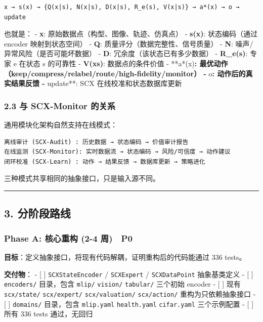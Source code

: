 \documentclass[
  12pt,
]{ctexart}
\begin{document}
\begin{verbatim}
x → s(x) → {Q(x|s), N(x|s), D(x|s), R_e(s), V(x|s)} → a*(x) → o → update
\end{verbatim}

也就是： - \textbf{x}: 原始数据点（构型、图像、轨迹、仿真点） -
\textbf{s(x)}: 状态编码（通过 encoder 映射到状态空间） - \textbf{Q}:
质量评分（数据完整性、信号质量） - \textbf{N}:
噪声/异常风险（是否可能坏数据） - \textbf{D}:
冗余度（该状态已有多少数据） - \textbf{R\_e(s)}: 专家 e 在状态 s
的可靠性 - \textbf{V(x\textbar s)}: 数据点的条件价值 - **a*(x)\textbf{:
最优动作（keep/compress/relabel/route/high-fidelity/monitor） -
}o\textbf{: 动作后的真实结果反馈 - }update**: SCX
在线校准和状态数据库更新

\subsubsection{2.3 与 SCX-Monitor
的关系}\label{ux4e0e-scx-monitor-ux7684ux5173ux7cfb}

通用模块化架构自然支持在线模式：

\begin{verbatim}
离线审计 (SCX-Audit) : 历史数据 → 状态编码 → 价值审计报告
在线监测 (SCX-Monitor): 实时数据流 → 状态编码 → 风险/可信度 → 动作建议
闭环校准 (SCX-Learn) : 动作 → 结果反馈 → 数据库更新 → 策略进化
\end{verbatim}

三种模式共享相同的抽象接口，只是输入源不同。

\begin{center}\rule{0.5\linewidth}{0.5pt}\end{center}

\subsection{3. 分阶段路线}\label{ux5206ux9636ux6bb5ux8defux7ebf}

\subsubsection{Phase A: 核心重构 (2-4 周) 🔴
P0}\label{phase-a-ux6838ux5fc3ux91cdux6784-2-4-ux5468-p0}

\textbf{目标}：定义抽象接口，将现有代码解耦，证明重构后的代码能通过 336
tests。

\textbf{交付物}： - {[} {]} \texttt{SCXStateEncoder} /
\texttt{SCXExpert} / \texttt{SCXDataPoint} 抽象基类定义 - {[} {]}
\texttt{encoders/} 目录，包含 \texttt{mlip/} \texttt{vision/}
\texttt{tabular/} 三个初始 encoder - {[} {]} 现有 \texttt{scx/state/}
\texttt{scx/expert/} \texttt{scx/valuation/} \texttt{scx/action/}
重构为只依赖抽象接口 - {[} {]} \texttt{domains/} 目录，包含
\texttt{mlip.yaml} \texttt{health.yaml} \texttt{cifar.yaml} 三个示例配置
- {[} {]} 所有 336 tests 通过，无回归
\end{document}
